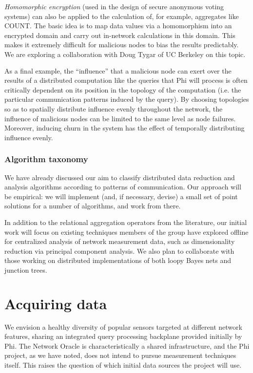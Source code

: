 \documentclass[twocolumn,10pt]{article}
\def\Sys{Network Oracle\xspace}
\def\Lrp{Phi\xspace}
\begin{document}
\textit{Homomorphic encryption} (used in the design of secure
anonymous voting systems) can also be applied to the calculation 
of, for example, aggregates like COUNT.  The basic idea is to map data
values via a homomorphism into an encrypted domain and carry out
in-network calculations in this domain.  This makes it extremely
difficult for malicious nodes to bias the results predictably.  We are
exploring a collaboration with Doug Tygar of UC Berkeley on this
topic.

As a final example, the ``influence'' that a malicious node can exert
over the results of a distributed computation like the queries that
\Lrp will process is often critically dependent on its position in the
topology of the computation (i.e. the particular communication
patterns induced by the query).  By choosing topologies so as to
spatially distribute influence evenly throughout the network, the
influence of malicious nodes can be limited to the same level as node
failures. Moreover, inducing churn in the system has the effect of
temporally distributing influence evenly. 

\subsubsection*{Algorithm taxonomy}

We have already discussed our aim to classify distributed data
reduction and analysis algorithms according to patterns of
communication.  Our approach will be empirical: we will implement 
(and, if necessary, devise) a small set of point solutions for a
number of algorithms, and work from there.  

In addition to the relational aggregation operators from the
literature, our initial work will focus on existing techniques members
of the group have explored offline for centralized analysis of network
measurement data, such as dimensionality reduction via principal
component analysis.  We also plan to collaborate with those working on
distributed implementations of both loopy Bayes nets and junction trees. 

\section{Acquiring data}

We envision a healthy diversity of popular sensors targeted at
different network features, sharing an integrated query processing
backplane provided initially by \Lrp.
The \Sys is characteristically a shared infrastructure, and the \Lrp
project, as we have noted, does not intend to pursue measurement
techniques itself.  This raises the question of which initial data
sources the project will use. 
\end{document}
